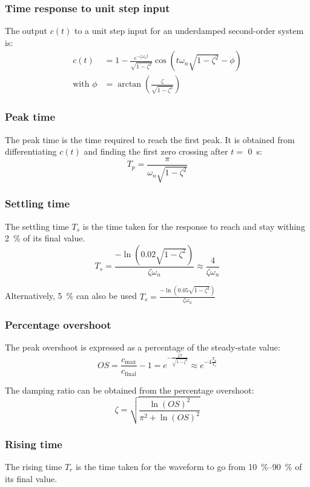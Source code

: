 \documentclass[10pt, twocolumn]{article}
\begin{document}
\subsubsection{Time response to unit step input}
The output \(c(t)\) to a unit step input for an underdamped second-order system is:
\begin{align*}
  c(t)              & = 1 - \frac{e^{-\zeta\omega_n t}}{\sqrt{1 - \zeta^2}} \cos \left( t \omega_n \sqrt{1 - \zeta^2} - \phi \right) \\
  \text{with } \phi & = \arctan\left( \frac{\zeta}{\sqrt{1 - \zeta^2}} \right)
\end{align*}


\subsubsection{Peak time}
The peak time is the time required to reach the first peak.
It is obtained from differentiating \(c(t)\) and finding the first zero crossing after \(t =\) \SI{0}{\second}:
\[
  T_p = \frac{\pi}{\omega_n \sqrt{1 - \zeta^2}}
\]


\subsubsection{Settling time}
The settling time \(T_s\) is the time taken for the response to reach and stay withing \SI{2}{\percent} of its final value.
\[
  T_s = \frac{-\ln\left( 0.02 \sqrt{1 - \zeta^2} \right)}{\zeta\omega_n} \approx \frac{4}{\zeta\omega_n}
\]

\begin{remark}
  Alternatively, \SI{5}{\percent} can also be used \(T_s = \frac{-\ln\left( 0.05 \sqrt{1 - \zeta^2} \right)}{\zeta\omega_n}\)
\end{remark}


\subsubsection{Percentage overshoot}
The peak overshoot is expressed as a percentage of the steady-state value:
\[
  OS = \frac{c_\mathrm{max}}{c_\mathrm{final}} - 1 = e^{-\frac{\zeta \pi}{\sqrt{1 - \zeta^2}}} \approx e^{-4\frac{T_p}{T_s}}
\]

The damping ratio can be obtained from the percentage overshoot:
\[
  \zeta = \sqrt{\frac{\ln(OS)^2}{\pi^2 + \ln(OS)^2}}
\]


\subsubsection{Rising time}
The rising time \(T_r\) is the time taken for the waveform to go from \SIrange{10}{90}{\percent} of its final value.
\end{document}
